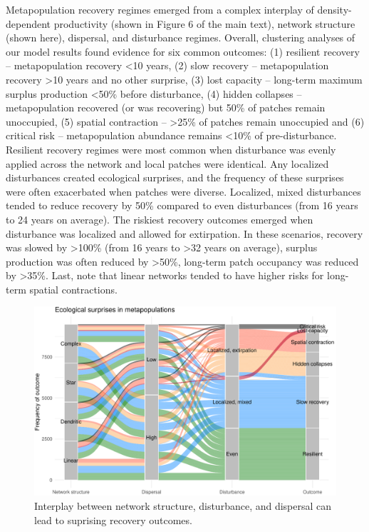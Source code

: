 \documentclass[
]{article}
\begin{document}
Metapopulation recovery regimes emerged from a complex interplay of
density-dependent productivity (shown in Figure 6 of the main text),
network structure (shown here), dispersal, and disturbance regimes.
Overall, clustering analyses of our model results found evidence for six
common outcomes: (1) resilient recovery -- metapopulation recovery
\textless10 years, (2) slow recovery -- metapopulation recovery
\textgreater10 years and no other surprise, (3) lost capacity --
long-term maximum surplus production \textless50\% before disturbance,
(4) hidden collapses -- metapopulation recovered (or was recovering) but
50\% of patches remain unoccupied, (5) spatial contraction --
\textgreater25\% of patches remain unoccupied and (6) critical risk --
metapopulation abundance remains \textless10\% of pre-disturbance.
Resilient recovery regimes were most common when disturbance was evenly
applied across the network and local patches were identical. Any
localized disturbances created ecological surprises, and the frequency
of these surprises were often exacerbated when patches were diverse.
Localized, mixed disturbances tended to reduce recovery by 50\% compared
to even disturbances (from 16 years to 24 years on average). The
riskiest recovery outcomes emerged when disturbance was localized and
allowed for extirpation. In these scenarios, recovery was slowed by
\textgreater100\% (from 16 years to \textgreater32 years on average),
surplus production was often reduced by \textgreater50\%, long-term
patch occupancy was reduced by \textgreater35\%. Last, note that linear
networks tended to have higher risks for long-term spatial contractions.

\begin{figure}[H]

{\centering \includegraphics{Managing_for_ecological_surprises_in_metapopulations_files/figure-latex/cluster results-1} 

}

\caption{Interplay between network structure, disturbance, and dispersal can lead to suprising recovery outcomes.}\label{fig:cluster results}
\end{figure}
\end{document}
